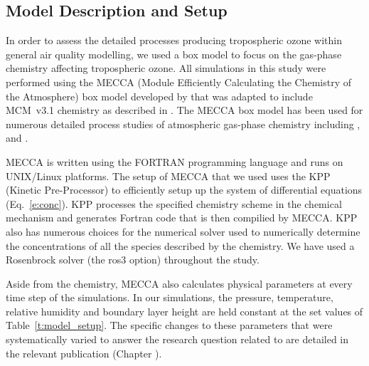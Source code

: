\subsection{Model Description and Setup} \label{ss:model_setup}
In order to assess the detailed processes producing tropospheric ozone within general air quality modelling, we used a box model to focus on the gas-phase chemistry affecting tropospheric ozone.
All simulations in this study were performed using the MECCA (Module Efficiently Calculating the Chemistry of the Atmosphere) box model developed by \citet{Sander:2005} that was adapted to include MCM~v3.1 chemistry as described in \citet{Butler:2011}.
The MECCA box model has been used for numerous detailed process studies of atmospheric gas-phase chemistry including \citet{Kubistin:2010}, \citet{Xie:2008} and \citet{Lourens:2012}.

MECCA is written using the FORTRAN programming language and runs on UNIX/Linux platforms.
The setup of MECCA that we used uses the KPP (Kinetic Pre-Processor) \citep{Damian:2002} to efficiently setup up the system of differential equations (Eq.~\eqref{e:conc}).
KPP processes the specified chemistry scheme in the chemical mechanism and generates Fortran code that is then compilied by MECCA.
KPP also has numerous choices for the numerical solver used to numerically determine the concentrations of all the species described by the chemistry.
We have used a Rosenbrock solver (the ros3 option) throughout the study.

Aside from the chemistry, MECCA also calculates physical parameters at every time step of the simulations.
In our simulations, the pressure, temperature, relative humidity and boundary layer height are held constant at the set values of Table~\ref{t:model_setup}.
The specific changes to these parameters that were systematically varied to answer the research question related to  are detailed in the relevant publication (Chapter ). 


